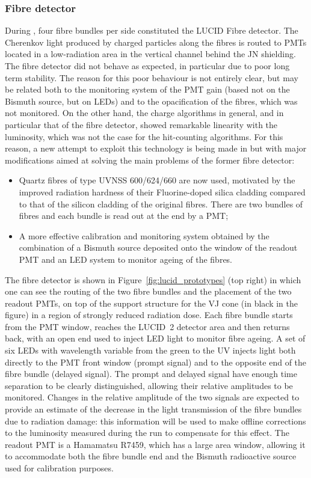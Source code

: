 \documentclass[cernpreprint, atlasdraft=false, UKenglish,british,orcidlogo, texmf, orcidlogo]{atlasdoc}
\begin{document}
\subsubsection{Fibre detector}
During \RunTwo, four fibre bundles per side constituted the \gls{LUCID} Fibre detector. The Cherenkov light produced by charged particles along the fibres
is routed to \glspl{PMT} located in a low-radiation area in the
vertical channel behind the JN shielding. The fibre detector did not behave
as expected, in particular due to poor long term stability. The reason
for this poor behaviour is not entirely clear, but may be related both to
the monitoring system of the \gls{PMT} gain (based not on the Bismuth source, but
on \glspl{LED}) and to the opacification of the fibres, which was not
monitored.
On the other hand, the charge algorithms in general, and in particular
that of the fibre detector, showed remarkable linearity with the
luminosity, which was not the case for the hit-counting algorithms. For this
reason, a new attempt to exploit this technology is being made in \RunThr but
with major modifications aimed at solving the main problems of the former
fibre detector:
\begin{itemize}
\item{Quartz fibres of type UVNSS 600/624/660 are now used, motivated by the improved radiation hardness of their Fluorine-doped silica cladding compared to that of the silicon cladding of the original fibres. There are two bundles of fibres and each bundle is read out
at the end by a \gls{PMT};}
\item{A more effective calibration and monitoring system obtained by the combination of a Bismuth source deposited onto the window of the readout \gls{PMT} and an \gls{LED} system to monitor ageing of the fibres.}
\end{itemize}
The fibre detector is shown in Figure~\ref{fig:lucid_prototypes} (top right) in which one can see the routing of the two fibre bundles and the placement of the two readout \glspl{PMT}, on top of the support structure for the VJ cone (in black in the figure) in a region of strongly reduced radiation dose. Each fibre bundle starts from the \gls{PMT} window, reaches the \gls{LUCID}~2 detector area and then returns back, with an open end used to inject \gls{LED} light to monitor fibre ageing.
A set of six \glspl{LED} with wavelength variable from the green to the UV injects light both directly to the \gls{PMT} front window
(prompt signal) and to the opposite end of the fibre bundle (delayed signal).
The prompt and delayed signal have enough time separation to be clearly distinguished, allowing their relative amplitudes to be monitored. Changes in the relative amplitude of the two signals
are expected to provide an estimate of the decrease in the light
transmission of the fibre bundles due to radiation damage: this
information will
be used to make offline corrections to the luminosity measured during the run
to compensate for this effect.
The readout \gls{PMT} is a Hamamatsu R7459, which has a large area window, allowing it to accommodate both the fibre bundle end and the Bismuth radioactive source used for calibration purposes.
 
\end{document}
